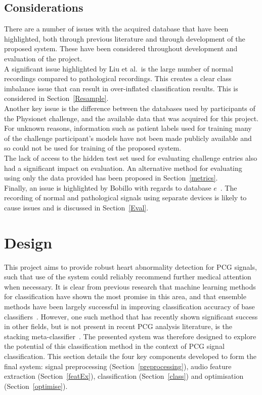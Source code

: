 \documentclass[titlepage, 12pt]{scrartcl} \usepackage{enumitem}
\begin{document}
\subsection{Considerations}\label{DBCons}
There are a number of issues with the acquired database that have been
highlighted, both through previous literature and through development of the
proposed system. These have been considered throughout development and evaluation of
the project.\\
A significant issue highlighted by Liu et al.\ is the large number of normal
recordings compared to pathological recordings. This creates a clear class
imbalance issue that can result in over-inflated classification
results. This is considered in
Section~\ref{Resample}.\\
Another key issue is the difference between the databases used by participants of the
Physionet challenge, and the available data that was acquired for this project.
For unknown reasons, information such as patient labels used for training many
of the challenge participant's models have not been made publicly available and
so could not be used for training of the proposed system.\\
The lack of access to the hidden test set used for evaluating challenge entries
also had a significant impact on evaluation. An alternative method for
evaluating using only the data provided has been proposed in
Section~\ref{metrics}.\\
Finally, an issue is highlighted by Bobillo with regards to database
$e$~\parencite{Bobillo2016}. The recording of normal and pathological signals using
separate devices is likely to cause issues and is discussed in
Section~\ref{Eval}.

\pagebreak
\section{Design}
This project aims to provide robust heart abnormality detection for PCG
signals, such that use of the system could reliably recommend further medical
attention when necessary. It is clear from previous research that machine
learning methods for classification have shown the most promise in this area,
and that ensemble methods have been largely successful in improving
classification accuracy of base classifiers~\parencite{Homsi2017, Potes2016}.
However, one such method that has recently shown significant success in other
fields, but is not present in recent PCG analysis literature, is the stacking
meta-classifier~\parencite[p.498]{Tobergte2013a}. The presented system was
therefore designed to explore the potential of this classification method in
the context of PCG signal classification. This section details the four key
components developed to form the final system: signal preprocessing
(Section~\ref{preprocessing}), audio feature extraction (Section~\ref{featEx}),
classification (Section~\ref{class}) and optimisation (Section~\ref{optimise}).
\end{document}
